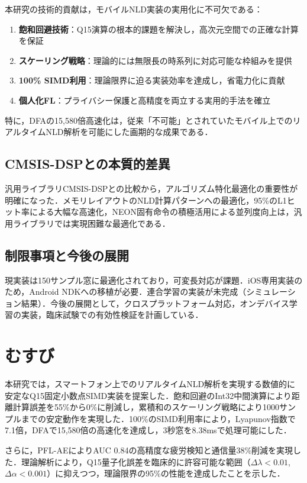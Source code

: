 \documentclass[10pt,twocolumn]{article}
\begin{document}
\begin{CJK}{UTF8}{min}
本研究の技術的貢献は，モバイルNLD実装の実用化に不可欠である：

\begin{enumerate}
\item \textbf{飽和回避技術}：Q15演算の根本的課題を解決し，高次元空間での正確な計算を保証
\item \textbf{スケーリング戦略}：理論的には無限長の時系列に対応可能な枠組みを提供
\item \textbf{100\% SIMD利用}：理論限界に迫る実装効率を達成し，省電力化に貢献
\item \textbf{個人化FL}：プライバシー保護と高精度を両立する実用的手法を確立
\end{enumerate}

特に，DFAの15,580倍高速化は，従来「不可能」とされていたモバイル上でのリアルタイムNLD解析を可能にした画期的な成果である．

\subsection{CMSIS-DSPとの本質的差異}

汎用ライブラリCMSIS-DSPとの比較から，アルゴリズム特化最適化の重要性が明確になった．メモリレイアウトのNLD計算パターンへの最適化，95\%のL1ヒット率による大幅な高速化，NEON固有命令の積極活用による並列度向上は，汎用ライブラリでは実現困難な最適化である．

\subsection{制限事項と今後の展開}

現実装は150サンプル窓に最適化されており，可変長対応が課題．iOS専用実装のため，Android NDKへの移植が必要．連合学習の実装が未完成（シミュレーション結果）．今後の展開として，クロスプラットフォーム対応，オンデバイス学習の実装，臨床試験での有効性検証を計画している．

\section{むすび}

本研究では，スマートフォン上でのリアルタイムNLD解析を実現する数値的に安定なQ15固定小数点SIMD実装を提案した．飽和回避のInt32中間演算により距離計算誤差を55\%から0\%に削減し，累積和のスケーリング戦略により1000サンプルまでの安定動作を実現した．100\%のSIMD利用率により，Lyapunov指数で7.1倍，DFAで15,580倍の高速化を達成し，3秒窓を8.38msで処理可能にした．

さらに，PFL-AEによりAUC 0.84の高精度な疲労検知と通信量38\%削減を実現した．理論解析により，Q15量子化誤差を臨床的に許容可能な範囲（$\Delta\lambda < 0.01$, $\Delta\alpha < 0.001$）に抑えつつ，理論限界の95\%の性能を達成したことを示した．


\end{CJK}
\end{document}

